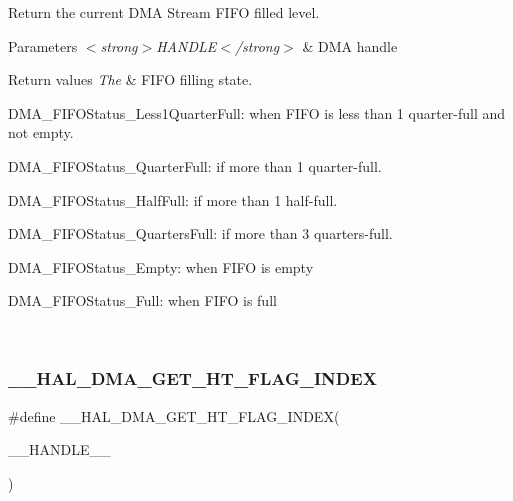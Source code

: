 Return the current D\+MA Stream F\+I\+FO filled level. 


\begin{DoxyParams}{Parameters}
{\em $<$strong$>$\+H\+A\+N\+D\+L\+E$<$/strong$>$} & D\+MA handle \\
\hline
\end{DoxyParams}

\begin{DoxyRetVals}{Return values}
{\em The} & F\+I\+FO filling state.
\begin{DoxyItemize}
\item D\+M\+A\+\_\+\+F\+I\+F\+O\+Status\+\_\+\+Less1\+Quarter\+Full\+: when F\+I\+FO is less than 1 quarter-\/full and not empty.
\item D\+M\+A\+\_\+\+F\+I\+F\+O\+Status\+\_\+Quarter\+Full\+: if more than 1 quarter-\/full.
\item D\+M\+A\+\_\+\+F\+I\+F\+O\+Status\+\_\+\+Half\+Full\+: if more than 1 half-\/full.
\item D\+M\+A\+\_\+\+F\+I\+F\+O\+Status\+\_\+Quarters\+Full\+: if more than 3 quarters-\/full.
\item D\+M\+A\+\_\+\+F\+I\+F\+O\+Status\+\_\+\+Empty\+: when F\+I\+FO is empty
\item D\+M\+A\+\_\+\+F\+I\+F\+O\+Status\+\_\+\+Full\+: when F\+I\+FO is full 
\end{DoxyItemize}\\
\hline
\end{DoxyRetVals}
\mbox{\label{group___d_m_a_ga0095f5f3166a82bedc67744ac94acfba}} 
\subsubsection{\texorpdfstring{\+\_\+\+\_\+\+H\+A\+L\+\_\+\+D\+M\+A\+\_\+\+G\+E\+T\+\_\+\+H\+T\+\_\+\+F\+L\+A\+G\+\_\+\+I\+N\+D\+EX}{\_\_HAL\_DMA\_GET\_HT\_FLAG\_INDEX}}
{\footnotesize\ttfamily \#define \+\_\+\+\_\+\+H\+A\+L\+\_\+\+D\+M\+A\+\_\+\+G\+E\+T\+\_\+\+H\+T\+\_\+\+F\+L\+A\+G\+\_\+\+I\+N\+D\+EX(\begin{DoxyParamCaption}\item[{}]{\+\_\+\+\_\+\+H\+A\+N\+D\+L\+E\+\_\+\+\_\+ }\end{DoxyParamCaption})}


